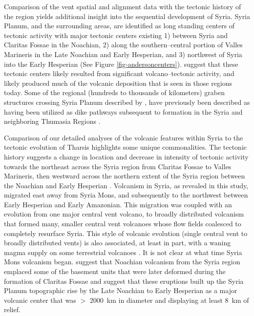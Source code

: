 \documentclass[preprint,review,authoryear,12pt]{elsarticle}
\begin{document}
Comparison of the vent spatial and alignment data with the tectonic history of the region yields additional insight into the sequential development of Syria. Syria Planum, and the surrounding areas, are identified as long standing centers of tectonic activity with major tectonic centers existing 1) between Syria and Claritas Fossae in the Noachian, 2) along the southern--central portion of Valles Marineris in the Late Noachian and Early Hesperian, and 3) northwest of Syria into the Early Hesperian \citep{Dohm1999,Anderson2001,Anderson2004} (See Figure \ref{fig-andersoncenters}).  \citet{Dohm1999} suggest that these tectonic centers likely resulted from significant volcano--tectonic activity, and likely produced much of the volcanic deposition that is seen in those regions today. Some of the regional (hundreds to thousands of kilometers) graben structures crossing Syria Planum described by \citet{Dohm1999}, have previously been described as having been utilized as dike pathways subsequent to formation in the Syria and neighboring Thumasia Regions \citep{Plescia1982,Mege1996,Wilson2002}.

Comparison of our detailed analyses of the volcanic features within Syria to the tectonic evolution of Tharsis highlights some unique commonalities.  The tectonic history suggests a change in location and decrease in intensity of tectonic activity towards the northeast across the Syria region from Claritas Fossae to Valles Marineris, then westward across the northern extent of the Syria region between the Noachian and Early Hesperian \citep{Dohm1999,Anderson2002,Anderson2004}.  Volcanism in Syria, as revealed in this study, migrated east away from Syria Mons, and subsequently to the northwest between Early Hesperian and Early Amazonian. This migration was coupled with an evolution from one major central vent volcano, to broadly distributed volcanism that formed many, smaller central vent volcanoes whose flow fields coalesced to completely resurface Syria.  This style of volcanic evolution (single central vent to broadly distributed vents) is also associated, at least in part, with a waning magma supply on some terrestrial volcanoes \citep{Moore2007,Wolfe1996,Rowland2000,Bleacher2008}.  It is not clear at what time Syria Mons volcanism began.  \citet{Dohm1999} suggest that Noachian volcanism from the Syria region emplaced some of the basement units that were later deformed during the formation of Claritas Fossae and \citet{Webb2001} suggest that these eruptions built up the Syria Planum topographic rise by the Late Noachian to Early Hesperian as a major volcanic center that was $>$ 2000~km in diameter and displaying at least 8~km of relief.
\end{document}
